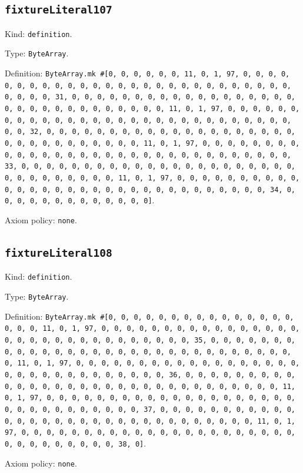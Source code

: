 \documentclass[11pt]{article}
\begin{document}
\subsection*{\texttt{fixtureLiteral107}}
\noindent Kind: \texttt{definition}.\par
\noindent Type: \texttt{ByteArray}.\par
\noindent Definition: \texttt{ByteArray.mk \#[0, 0, 0, 0, 0, 0, 11, 0, 1, 97, 0, 0, 0, 0, 0, 0, 0, 0, 0, 0, 0, 0, 0, 0, 0, 0, 0, 0, 0, 0, 0, 0, 0, 0, 0, 0, 0, 0, 0, 0, 0, 31, 0, 0, 0, 0, 0, 0, 0, 0, 0, 0, 0, 0, 0, 0, 0, 0, 0, 0, 0, 0, 0, 0, 0, 0, 0, 0, 0, 0, 0, 0, 0, 11, 0, 1, 97, 0, 0, 0, 0, 0, 0, 0, 0, 0, 0, 0, 0, 0, 0, 0, 0, 0, 0, 0, 0, 0, 0, 0, 0, 0, 0, 0, 0, 0, 0, 0, 32, 0, 0, 0, 0, 0, 0, 0, 0, 0, 0, 0, 0, 0, 0, 0, 0, 0, 0, 0, 0, 0, 0, 0, 0, 0, 0, 0, 0, 0, 0, 0, 11, 0, 1, 97, 0, 0, 0, 0, 0, 0, 0, 0, 0, 0, 0, 0, 0, 0, 0, 0, 0, 0, 0, 0, 0, 0, 0, 0, 0, 0, 0, 0, 0, 0, 0, 33, 0, 0, 0, 0, 0, 0, 0, 0, 0, 0, 0, 0, 0, 0, 0, 0, 0, 0, 0, 0, 0, 0, 0, 0, 0, 0, 0, 0, 0, 0, 0, 11, 0, 1, 97, 0, 0, 0, 0, 0, 0, 0, 0, 0, 0, 0, 0, 0, 0, 0, 0, 0, 0, 0, 0, 0, 0, 0, 0, 0, 0, 0, 0, 0, 0, 0, 34, 0, 0, 0, 0, 0, 0, 0, 0, 0, 0, 0, 0, 0]}.\par
\noindent Axiom policy: \texttt{none}.\par
\subsection*{\texttt{fixtureLiteral108}}
\noindent Kind: \texttt{definition}.\par
\noindent Type: \texttt{ByteArray}.\par
\noindent Definition: \texttt{ByteArray.mk \#[0, 0, 0, 0, 0, 0, 0, 0, 0, 0, 0, 0, 0, 0, 0, 0, 0, 0, 11, 0, 1, 97, 0, 0, 0, 0, 0, 0, 0, 0, 0, 0, 0, 0, 0, 0, 0, 0, 0, 0, 0, 0, 0, 0, 0, 0, 0, 0, 0, 0, 0, 0, 0, 35, 0, 0, 0, 0, 0, 0, 0, 0, 0, 0, 0, 0, 0, 0, 0, 0, 0, 0, 0, 0, 0, 0, 0, 0, 0, 0, 0, 0, 0, 0, 0, 11, 0, 1, 97, 0, 0, 0, 0, 0, 0, 0, 0, 0, 0, 0, 0, 0, 0, 0, 0, 0, 0, 0, 0, 0, 0, 0, 0, 0, 0, 0, 0, 0, 0, 0, 36, 0, 0, 0, 0, 0, 0, 0, 0, 0, 0, 0, 0, 0, 0, 0, 0, 0, 0, 0, 0, 0, 0, 0, 0, 0, 0, 0, 0, 0, 0, 0, 11, 0, 1, 97, 0, 0, 0, 0, 0, 0, 0, 0, 0, 0, 0, 0, 0, 0, 0, 0, 0, 0, 0, 0, 0, 0, 0, 0, 0, 0, 0, 0, 0, 0, 0, 37, 0, 0, 0, 0, 0, 0, 0, 0, 0, 0, 0, 0, 0, 0, 0, 0, 0, 0, 0, 0, 0, 0, 0, 0, 0, 0, 0, 0, 0, 0, 0, 11, 0, 1, 97, 0, 0, 0, 0, 0, 0, 0, 0, 0, 0, 0, 0, 0, 0, 0, 0, 0, 0, 0, 0, 0, 0, 0, 0, 0, 0, 0, 0, 0, 0, 0, 38, 0]}.\par
\noindent Axiom policy: \texttt{none}.\par
\end{document}

